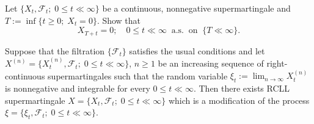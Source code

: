 \documentclass{report}
\begin{document}
\begin{prob}
	Let \( \{X_t,\mathscr{F}_t;\; 0\le t\ll \infty \} \) be a continuous, nonnegative supermartingale and \( T:=\inf \{t\ge 0;\;X_t=0\} \). Show that
	\[X_{T+t}=0;\quad 0\le t\ll \infty \;\;\mathrm{a.s.\;\;on} \;\; \{ T \ll \infty \}.\]
\end{prob}

\begin{exe}
	Suppose that the filtration \( \{\mathscr{F}_t\} \) satisfies the usual conditions and let 
	\( X^{(n)}=\{X_t^{(n)},\mathscr{F}_t;\; 0\le t\ll \infty \} \), \( n\ge 1 \) be an increasing sequence of right-continuous supermartingales such that the random variable
	\( \xi_t:=\lim_{n\to \infty }X_t^{(n)} \) is nonnegative and integrable for every \( 0\le t\ll \infty \).
	Then there exists RCLL supermartingale \( X=\{X_t,\mathscr{F}_t;\; 0\le t\ll \infty \} \) which is a modification of the process \( \xi=\{\xi_t,\mathscr{F}_t;\; 0\le t\ll \infty \} \).
\end{exe}
\end{document}
